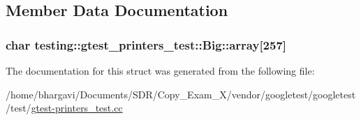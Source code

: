 \subsection{Member Data Documentation}
\subsubsection[{\texorpdfstring{array}{array}}]{\setlength{\rightskip}{0pt plus 5cm}char testing\+::gtest\+\_\+printers\+\_\+test\+::\+Big\+::array\mbox{[}257\mbox{]}}\hypertarget{structtesting_1_1gtest__printers__test_1_1_big_a863911a8ec5c3bbe79c44d399f1de61f}{}\label{structtesting_1_1gtest__printers__test_1_1_big_a863911a8ec5c3bbe79c44d399f1de61f}


The documentation for this struct was generated from the following file\+:\begin{DoxyCompactItemize}
\item 
/home/bhargavi/\+Documents/\+S\+D\+R/\+Copy\+\_\+\+Exam\+\_\+X/vendor/googletest/googletest/test/\hyperlink{gtest-printers__test_8cc}{gtest-\/printers\+\_\+test.\+cc}\end{DoxyCompactItemize}
